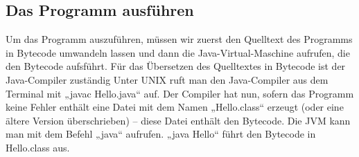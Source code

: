 \subsection{Das Programm ausführen}
Um das Programm auszuführen, müssen wir zuerst den Quelltext des Programms in Bytecode umwandeln lassen und dann die Java-Virtual-Maschine aufrufen, die den Bytecode aufsführt. 
Für das Übersetzen des Quelltextes in Bytecode ist der Java-Compiler zuständig
Unter UNIX ruft man den Java-Compiler aus dem Terminal mit „javac Hello.java“ auf. Der Compiler hat nun, sofern das Programm keine Fehler enthält eine Datei mit dem Namen „Hello.class“ erzeugt (oder eine ältere Version überschrieben) – diese Datei enthält den Bytecode.
Die JVM kann man mit dem Befehl „java“ aufrufen. „java Hello“ führt den Bytecode in Hello.class aus.
